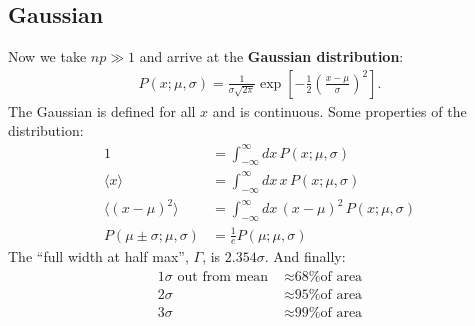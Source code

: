 \documentclass{article}
\begin{document}
\subsection{Gaussian}
Now we take $np \gg 1$ and arrive at the {\bf Gaussian distribution}:
\begin{align}
  P(x;\mu,\sigma) = \frac{1}{\sigma\sqrt{2\pi}}\exp\left[-\frac{1}{2}\left(\frac{x-\mu}{\sigma}\right)^2\right].
\end{align}
The Gaussian is defined for all $x$ and is continuous. Some properties of the distribution:
\begin{align*}
  1                              & = \int_{-\infty}^{\infty}dx\,P(x;\mu,\sigma)            \\
  \langle x \rangle              & = \int_{-\infty}^{\infty}dx\,x\,P(x;\mu,\sigma)         \\
  \langle (x-\mu)^2\rangle       & = \int_{-\infty}^{\infty}dx\,(x-\mu)^2\,P(x;\mu,\sigma) \\
  P(\mu\pm\sigma;\mu,\sigma)     & = \frac{1}{e}P(\mu;\mu,\sigma)
\end{align*}
The ``full width at half max'', $\Gamma$, is $2.354\sigma$. And finally:
\begin{align*}
  1\sigma \text{ out from mean } &\approx \text{68\% of area}                              \\
  2\sigma                        &\approx \text{95\% of area}                              \\
  3\sigma                        &\approx \text{99\% of area}
\end{align*}
\end{document}
